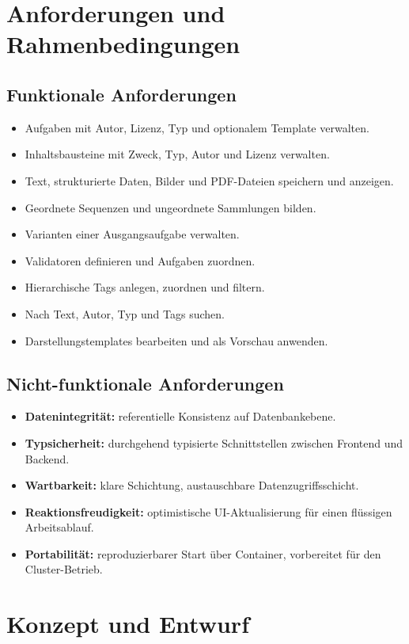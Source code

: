 ﻿\documentclass[11pt,a4paper]{article}
\begin{document}
\section{Anforderungen und Rahmenbedingungen}
\subsection{Funktionale Anforderungen}
\begin{itemize}
\item Aufgaben mit Autor, Lizenz, Typ und optionalem Template verwalten.
\item Inhaltsbausteine mit Zweck, Typ, Autor und Lizenz verwalten.
\item Text, strukturierte Daten, Bilder und PDF-Dateien speichern und anzeigen.
\item Geordnete Sequenzen und ungeordnete Sammlungen bilden.
\item Varianten einer Ausgangsaufgabe verwalten.
\item Validatoren definieren und Aufgaben zuordnen.
\item Hierarchische Tags anlegen, zuordnen und filtern.
\item Nach Text, Autor, Typ und Tags suchen.
\item Darstellungstemplates bearbeiten und als Vorschau anwenden.
\end{itemize}

\subsection{Nicht-funktionale Anforderungen}
\begin{itemize}

  \item \textbf{Datenintegrität:} referentielle Konsistenz auf Datenbankebene.
  \item \textbf{Typsicherheit:} durchgehend typisierte Schnittstellen zwischen
  Frontend und Backend.
  \item \textbf{Wartbarkeit:} klare Schichtung, austauschbare Datenzugriffsschicht.
  \item \textbf{Reaktionsfreudigkeit:} optimistische UI-Aktualisierung für einen
  flüssigen Arbeitsablauf.
  \item \textbf{Portabilität:} reproduzierbarer Start über Container, vorbereitet
  für den Cluster-Betrieb.

  \end{itemize}

\section{Konzept und Entwurf}
\end{document}
